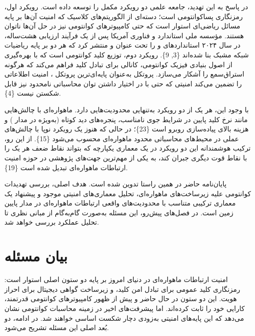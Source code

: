 \documentclass[a4paper,14pt]{extreport}
\begin{document}
در پاسخ به این تهدید، جامعه علمی دو رویکرد مکمل را توسعه داده است. رویکرد اول، رمزنگاری پساکوانتومی  است؛ دسته‌ای از الگوریتم‌های کلاسیک که امنیت آن‌ها بر پایه مسائل ریاضی‌ای استوار است که حتی کامپیوترهای کوانتومی نیز در حل آن‌ها ناتوان هستند. مؤسسه ملی استاندارد و فناوری آمریکا  پس از یک فرآیند ارزیابی هشت‌ساله، در سال ۲۰۲۴ استانداردهای  و  را تحت عنوان  و  منتشر کرد که هر دو بر پایه ریاضیات شبکه مشبک  بنا شده‌اند \{3, 9\}. رویکرد دوم، توزیع کلید کوانتومی  است که با بهره‌گیری از اصول بنیادی فیزیک کوانتومی، کانالی برای تبادل کلید فراهم می‌کند که هرگونه استراق‌سمع را آشکار می‌سازد. پروتکل  به‌عنوان پایه‌ای‌ترین پروتکل ، امنیت اطلاعاتی  را تضمین می‌کند  امنیتی که حتی با در اختیار داشتن توان محاسباتی نامحدود نیز قابل شکستن نیست \{4\}.

با وجود این، هر یک از دو رویکرد به‌تنهایی محدودیت‌هایی دارد.  ماهواره‌ای با چالش‌هایی مانند نرخ کلید پایین در شرایط جوی نامناسب، پنجره‌های دید کوتاه (به‌ویژه در مدار ) و هزینه بالای پیاده‌سازی روبرو است \{23\}؛ در حالی که  هنوز یک رویکرد نوپا با چالش‌های عملی در محیط‌های محاسباتی محدود ماهواره‌ای محسوب می‌شود \{15\}. از این رو، ترکیب هوشمندانه این دو رویکرد در یک معماری یکپارچه که بتواند نقاط ضعف هر یک را با نقاط قوت دیگری جبران کند، به یکی از مهم‌ترین جهت‌های پژوهشی در حوزه امنیت ارتباطات ماهواره‌ای تبدیل شده است \{19\}.

پایان‌نامه حاضر در همین راستا تدوین شده است. هدف اصلی، بررسی تهدیدات کوانتومی علیه زیرساخت‌های ماهواره‌ای، تحلیل معماری‌های امنیتی موجود و پیشنهاد یک معماری ترکیبی  متناسب با محدودیت‌های واقعی ارتباطات ماهواره‌ای در مدار پایین زمین  است. در فصل‌های پیش‌رو، این مسئله به‌صورت گام‌به‌گام از مبانی نظری تا تحلیل عملکرد بررسی خواهد شد.

\section{بیان مسئله}

امنیت ارتباطات ماهواره‌ای در دنیای امروز بر پایه دو ستون اصلی استوار است: رمزنگاری کلید عمومی برای تبادل امن کلید، و زیرساخت گواهی دیجیتال برای احراز هویت. این دو ستون در حال حاضر و پیش از ظهور کامپیوترهای کوانتومی قدرتمند، کارایی خود را ثابت کرده‌اند. اما پیشرفت‌های اخیر در زمینه محاسبات کوانتومی نشان می‌دهد که این پایه‌های امنیتی به‌زودی دچار شکست اساسی خواهند شد. در ادامه، دو بُعد اصلی این مسئله تشریح می‌شود.
\end{document}
